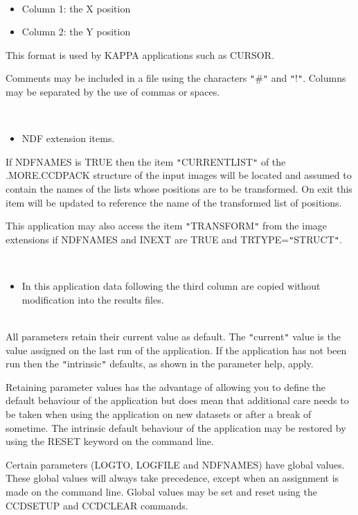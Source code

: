 \documentclass[twoside,11pt]{article}
\newcommand{\htmlref}[2]{#1}
\newcommand{\xref}[3]{#1}
\renewcommand{\_}{\texttt{\symbol{95}}}
\newcommand{\qt}[1]{{\tt "}#1{\tt "}}
\newcommand{\xroutine}[1]{\htmlref{{\sc #1}}{#1}}
\newcommand{\sstdiytopic}[2]{\item[#1:] \mbox{} \\[1.3ex] #2}
\newcommand{\sstitemlist}[1]{
  \mbox{} \\
  \vspace{-3.5ex}
  \begin{itemize}
     #1
  \end{itemize}
}
\newcommand{\sstitem}{\item}
\newcommand{\sstdiytopic}[2]{\item[{#1}] #2 }
\newcommand{\sstitemlist}[1]{
      \begin{itemize}
         #1
      \end{itemize}
      \\
   }
\newcommand{\sstitem}{\item}
\begin{document}
{{      \sstitemlist{

         \sstitem
             Column 1: the X position

         \sstitem
             Column 2: the Y position

      }
        This format is used by KAPPA applications such as
       \xref{CURSOR}{sun95}{CURSOR}.

        Comments may be included in a file using the characters \qt{\#} and
        \qt{!}. Columns may be separated by the use of commas or spaces.

      \sstitemlist{

         \sstitem
         NDF extension items.

      }
        If NDFNAMES is TRUE then the item \qt{CURRENT\_LIST} of the
        .MORE.CCDPACK structure of the input images will be located
        and assumed to contain the names of the lists whose positions
        are to be transformed. On exit this item will be updated to
        reference the name of the transformed list of positions.

        This application may also access the item \qt{TRANSFORM} from
        the image extensions if NDFNAMES and INEXT are TRUE and
        TRTYPE=\qt{STRUCT}.

      \sstitemlist{

         \sstitem
         In this application data following the third column are copied
           without modification into the results files.
      }
   }
   \sstdiytopic{
      Behaviour of parameters
   }{
      All parameters retain their current value as default. The
      \qt{current} value is the value assigned on the last run of the
      application. If the application has not been run then the
      \qt{intrinsic} defaults, as shown in the parameter help, apply.

      Retaining parameter values has the advantage of allowing you to
      define the default behaviour of the application but does mean
      that additional care needs to be taken when using the application
      on new datasets or after a break of sometime.  The intrinsic
      default behaviour of the application may be restored by using the
      RESET keyword on the command line.

      Certain parameters (LOGTO, LOGFILE and NDFNAMES) have global
      values. These global values will always take precedence, except
      when an assignment is made on the command line.  Global values may
      be set and reset using the \xroutine{CCDSETUP} and \xroutine{CCDCLEAR} commands.
   }
}
\end{document}
